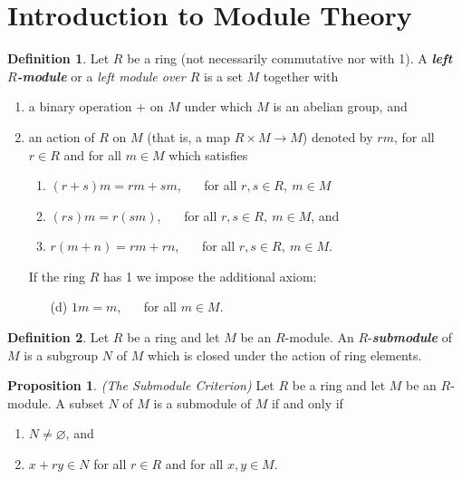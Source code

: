 \documentclass[10pt]{article}
\theoremstyle{definition}
\newtheorem*{prop}{Proposition}
\newtheorem*{defn}{Definition}
\newcommand{\nl}{\vspace{7em}}
\renewcommand{\hl}{}
\newcommand{\ra}{\rightarrow}
\newcommand{\es}{\varnothing}
\begin{document}
\section*{Introduction to Module Theory}

\begin{defn}
Let $R$ be a ring (not necessarily commutative nor with 1). A \textit{\textbf{left $R$-module}} or a \textit{left module over $R$} is a set $M$ together with
\begin{enumerate}
\item a binary operation $+$ on $M$ under which $M$ is an abelian group, and
\item an action of $R$ on $M$ (that is, a map $R\times M\ra M$) denoted by $rm$, for all $r\in R$ and for all $m\in M$ which satisfies
\begin{enumerate}
\item $(r + s)m = rm + sm$, \ \ \ for all $r,s\in R,\ m\in M$
\item $(rs)m = r(sm)$, \ \ \ for all $r,s\in R,\ m\in M$, and 
\item $r(m + n) = rm + rn$, \ \ \ for all $r,s\in R,\ m\in M$.
\end{enumerate}
If the ring $R$ has 1 we impose the additional axiom:
\begin{enumerate}
\item[(d)]  $1m = m$, \ \ \ for all $m\in M$.
\end{enumerate}
\end{enumerate}
\end{defn}

\nl

\begin{defn}
Let $R$ be a ring and let $M$ be an $R$-module. An $R$-\textit{\textbf{submodule}} of $M$ is a subgroup $N$ of $M$ which is closed under the action of ring elements. 
\end{defn}

\nl

\begin{prop}
\hl{\textit{(The Submodule Criterion)}} Let $R$ be a ring and let $M$ be an $R$-module. A subset $N$ of $M$ is a submodule of $M$ if and only if
\begin{enumerate}
\item $N\neq \es$, and
\item $x + ry\in N$ for all $r\in R$ and for all $x,y\in M$.
\end{enumerate}
\end{prop}

\nl
\end{document}
